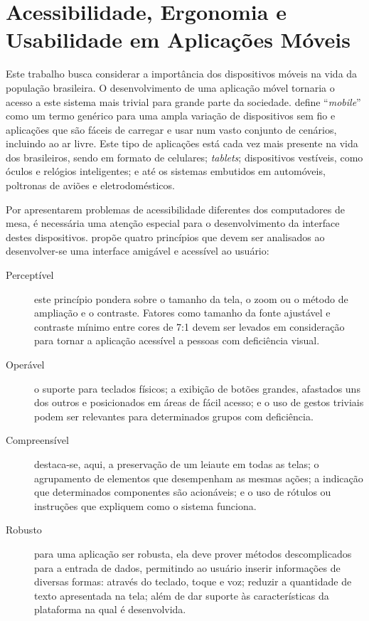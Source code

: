 \section{Acessibilidade, Ergonomia e Usabilidade em Aplicações Móveis}
Este trabalho busca considerar a importância dos dispositivos móveis na vida da população brasileira. O desenvolvimento de uma aplicação móvel tornaria o acesso a este sistema mais trivial para grande parte da sociedade. \cite{WCAG20} define “\emph{mobile}” como um termo genérico para uma ampla variação de dispositivos sem fio e aplicações que são fáceis de carregar e usar num vasto conjunto de cenários, incluindo ao ar livre. Este tipo de aplicações está cada vez mais presente na vida dos brasileiros, sendo em formato de celulares; \emph{tablets}; dispositivos vestíveis, como óculos e relógios inteligentes; e até os sistemas embutidos em automóveis, poltronas de aviões e eletrodomésticos.

Por apresentarem problemas de acessibilidade diferentes dos computadores de mesa, é necessária uma atenção especial para o desenvolvimento da interface destes dispositivos. \cite{WCAG20} propõe quatro princípios que devem ser analisados ao desenvolver-se uma interface amigável e acessível ao usuário:
\begin{description}
    \item [Perceptível] este princípio pondera sobre o tamanho da tela, o zoom ou o método de ampliação e o contraste. Fatores como tamanho da fonte ajustável e contraste mínimo entre cores de 7:1 devem ser levados em consideração para tornar a aplicação acessível a pessoas com deficiência visual.
    \item [Operável] o suporte para teclados físicos; a exibição de botões grandes, afastados uns dos outros e posicionados em áreas de fácil acesso; e o uso de gestos triviais podem ser relevantes para determinados grupos com deficiência.
    \item [Compreensível] destaca-se, aqui, a preservação de um leiaute em todas as telas; o agrupamento de elementos que desempenham as mesmas ações; a indicação que determinados componentes são acionáveis; e o uso de rótulos ou instruções que expliquem como o sistema funciona.
    \item [Robusto] para uma aplicação ser robusta, ela deve prover métodos descomplicados para a entrada de dados, permitindo ao usuário inserir informações de diversas formas: através do teclado, toque e voz; reduzir a quantidade de texto apresentada na tela; além de dar suporte às características da plataforma na qual é desenvolvida.
\end{description}

